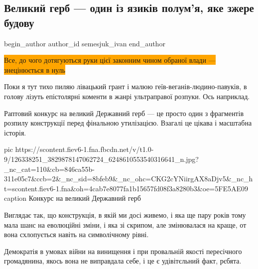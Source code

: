  
 
 
 
 
\subsection{Великий герб --- один із язиків полум'я, яке зжере будову}
\label{sec:20_11_2020.news.ua.gazeta.semesjuk_ivan.1.gerb}
\ifcmt
	begin_author
   author_id semesjuk_ivan
	end_author
\fi

\begin{center}
  \begin{fminipage}{0.7\textwidth}
		\color{blue}
		\colorbox{orange}{
Все, до чого дотягуються руки цієї законним чином обраної влади --- знецінюється в нуль
		}
  \end{fminipage}
\end{center}
  
Поки я тут тихо пиляю лівацький грант і малюю геїв-веганів-людино-павуків, в
голову лізуть епістолярні коменти в жанрі ультраправої розпуки. Ось наприклад.

Раптовий конкурс на великий Державний герб --- це просто один з фрагментів
розпилу конструкції перед фінальною утилізацією. Взагалі це цікава і масштабна
історія.

\ifcmt
pic https://scontent.fiev6-1.fna.fbcdn.net/v/t1.0-9/126338251_3829878147062724_6248610553540316641_n.jpg?_nc_cat=110&cb=846ca55b-311e05c7&ccb=2&_nc_sid=8bfeb9&_nc_ohc=CKG2cYNiirgAX8aDjv5&_nc_ht=scontent.fiev6-1.fna&oh=4cab7e8077fa1b15657fd08f3a8280b3&oe=5FE5AE09
caption Конкурс на великий Державний герб
\fi

Виглядає так, що конструкція, в якій ми досі живемо, і яка ще пару років тому
мала шанс на еволюційні зміни, і яка зі скрипом, але змінювалася на краще, от
вона схлопується навіть на символічному рівні.

Демократія в умовах війни на винищення і при провальній якості пересічного
громадянина, якось вона не виправдала себе, і це є удівітєльний факт, рєбята.

